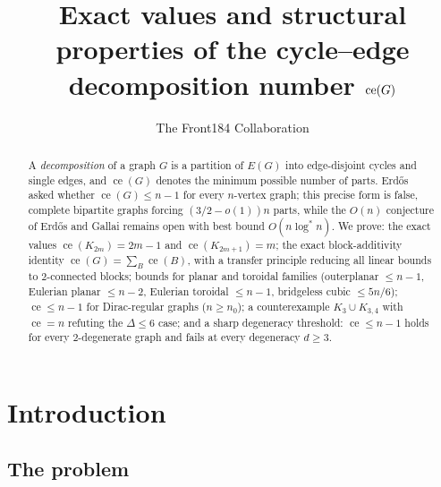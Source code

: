 \documentclass[a4paper,11pt]{amsart}
\title[The cycle--edge decomposition number of a graph]{Exact values and structural properties of the cycle--edge decomposition number $\ce(G)$}
\author{The Front184 Collaboration}
\theoremstyle{definition}
\theoremstyle{remark}
\newcommand{\ce}{\operatorname{ce}}
\begin{document}
\begin{abstract}
A \emph{decomposition} of a graph $G$ is a partition of $E(G)$ into edge-disjoint cycles and single edges,
and $\ce(G)$ denotes the minimum possible number of parts. Erd\H{o}s asked whether $\ce(G)\le n-1$ for every
$n$-vertex graph; this precise form is false, complete bipartite graphs forcing $(3/2-o(1))n$ parts, while
the $O(n)$ conjecture of Erd\H{o}s and Gallai remains open with best bound $O(n\log^* n)$. We prove: the
exact values $\ce(K_{2m})=2m-1$ and $\ce(K_{2m+1})=m$; the exact block-additivity identity
$\ce(G)=\sum_B \ce(B)$, with a transfer principle reducing all linear bounds to $2$-connected blocks; bounds
for planar and toroidal families (outerplanar $\le n-1$, Eulerian planar $\le n-2$, Eulerian toroidal
$\le n-1$, bridgeless cubic $\le 5n/6$); $\ce\le n-1$ for Dirac-regular graphs ($n\ge n_0$); a counterexample
$K_3\cup K_{3,4}$ with $\ce=n$ refuting the $\Delta\le 6$ case; and a sharp degeneracy threshold:
$\ce\le n-1$ holds for every $2$-degenerate graph and fails at every degeneracy $d\ge 3$.
\end{abstract}

\maketitle

\tableofcontents

\section{Introduction}\label{sec:intro}

\subsection{The problem}
\end{document}
